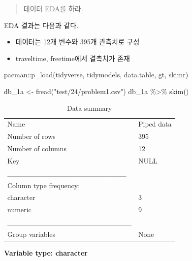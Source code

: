 \documentclass[
  letterpaper,
  DIV=11,
  numbers=noendperiod]{scrreprt}
\newenvironment{Shaded}{\begin{snugshade}}{\end{snugshade}}
\newcommand{\FunctionTok}[1]{\textcolor[rgb]{0.28,0.35,0.67}{#1}}
\newcommand{\NormalTok}[1]{\textcolor[rgb]{0.00,0.23,0.31}{#1}}
\newcommand{\OtherTok}[1]{\textcolor[rgb]{0.00,0.23,0.31}{#1}}
\newcommand{\SpecialCharTok}[1]{\textcolor[rgb]{0.37,0.37,0.37}{#1}}
\newcommand{\StringTok}[1]{\textcolor[rgb]{0.13,0.47,0.30}{#1}}
\providecommand{\tightlist}{%
  \setlength{\itemsep}{0pt}\setlength{\parskip}{0pt}}\usepackage{longtable,booktabs,array}
\begin{document}

\begin{quote}
데이터 EDA를 하라.
\end{quote}

EDA 결과는 다음과 같다.

\begin{itemize}
\tightlist
\item
  데이터는 12개 변수와 395개 관측치로 구성
\item
  traveltime, freetime에서 결측치가 존재
\end{itemize}

\begin{Shaded}
\begin{Highlighting}[]
\NormalTok{pacman}\SpecialCharTok{::}\FunctionTok{p\_load}\NormalTok{(tidyverse, tidymodels, data.table, gt, skimr)}

\NormalTok{db\_1a }\OtherTok{\textless{}{-}} \FunctionTok{fread}\NormalTok{(}\StringTok{"test/24/problem1.csv"}\NormalTok{)}
\NormalTok{db\_1a }\SpecialCharTok{\%\textgreater{}\%} \FunctionTok{skim}\NormalTok{()}
\end{Highlighting}
\end{Shaded}

\begin{longtable}[]{@{}ll@{}}
\caption{Data summary}\tabularnewline
\toprule()
\endhead
Name & Piped data \\
Number of rows & 395 \\
Number of columns & 12 \\
Key & NULL \\
\_\_\_\_\_\_\_\_\_\_\_\_\_\_\_\_\_\_\_\_\_\_\_ & \\
Column type frequency: & \\
character & 3 \\
numeric & 9 \\
\_\_\_\_\_\_\_\_\_\_\_\_\_\_\_\_\_\_\_\_\_\_\_\_ & \\
Group variables & None \\
\bottomrule()
\end{longtable}

\textbf{Variable type: character}
\end{document}
